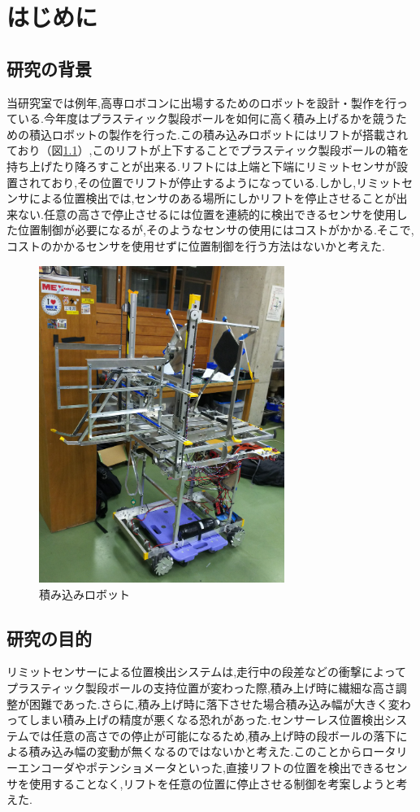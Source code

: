 \chapter{はじめに}

\section{研究の背景}
当研究室では例年,高専ロボコンに出場するためのロボットを設計・製作を行っている.今年度はプラスティック製段ボールを如何に高く積み上げるかを競うための積込ロボットの製作を行った.この積み込みロボットにはリフトが搭載されており（図\ref{fig:robot}）,このリフトが上下することでプラスティック製段ボールの箱を持ち上げたり降ろすことが出来る.リフトには上端と下端にリミットセンサが設置されており,その位置でリフトが停止するようになっている.しかし,リミットセンサによる位置検出では,センサのある場所にしかリフトを停止させることが出来ない.任意の高さで停止させるには位置を連続的に検出できるセンサを使用した位置制御が必要になるが,そのようなセンサの使用にはコストがかかる.そこで,コストのかかるセンサを使用せずに位置制御を行う方法はないかと考えた.

\begin{figure}[htbp]
  \begin{center}
    \includegraphics[width=80mm]{img/robot.JPG}
    \end{center}
  \caption{積み込みロボット}
 \label{fig:robot}
\end{figure}

\section{研究の目的}
リミットセンサーによる位置検出システムは,走行中の段差などの衝撃によってプラスティック製段ボールの支持位置が変わった際,積み上げ時に繊細な高さ調整が困難であった.さらに,積み上げ時に落下させた場合積み込み幅が大きく変わってしまい積み上げの精度が悪くなる恐れがあった.センサーレス位置検出システムでは任意の高さでの停止が可能になるため,積み上げ時の段ボールの落下による積み込み幅の変動が無くなるのではないかと考えた.このことからロータリーエンコーダやポテンショメータといった,直接リフトの位置を検出できるセンサを使用することなく,リフトを任意の位置に停止させる制御を考案しようと考えた.


